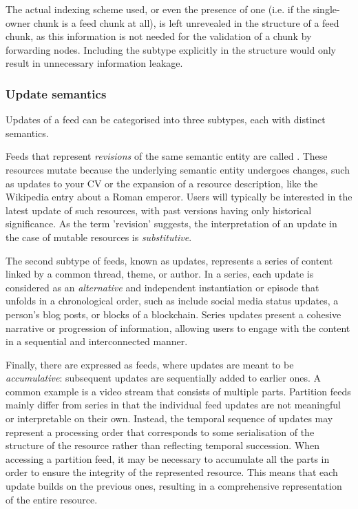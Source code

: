 The actual indexing scheme used, or even the presence of one (i.e. if the single-owner chunk is a feed chunk at all), is left unrevealed in the structure of a feed chunk, as this information is not needed for the validation of a chunk by forwarding nodes. Including the subtype explicitly in the structure would only result in unnecessary information leakage. 

\subsubsection{Update semantics}

Updates of a feed can be categorised into three subtypes, each with distinct semantics. 

Feeds that represent \emph{revisions} of the same semantic entity are called . These resources mutate because the underlying semantic entity undergoes changes, such as updates to your CV or the expansion of a resource description, like the Wikipedia entry about a Roman emperor. Users will typically be interested in the latest update of such resources, with past versions having only historical significance. As the term 'revision' suggests, the interpretation of an update in the case of mutable resources is \emph{substitutive}. 


The second subtype of feeds, known as  updates, represents a series of content linked by a common thread, theme, or author. In a series, each update is considered as an \emph{alternative} and independent instantiation or episode that unfolds in a chronological order, such as include social media status updates, a person's blog posts, or blocks of a blockchain. Series updates present a cohesive narrative or progression of information, allowing users to engage with the content in a sequential and interconnected manner.

Finally, there are  expressed as feeds, where updates are meant to be \emph{accumulative}: subsequent updates are sequentially added to earlier ones. A common example is a video stream that consists of multiple parts. Partition feeds mainly differ from series in that the individual feed updates are not meaningful or interpretable on their own. Instead, the temporal sequence of updates may represent a processing order that corresponds to some serialisation of the structure of the resource rather than reflecting temporal succession. When accessing a partition feed, it may be necessary to accumulate all the parts in order to ensure the integrity of the represented resource. This means that each update builds on the previous ones, resulting in a comprehensive representation of the entire resource.

